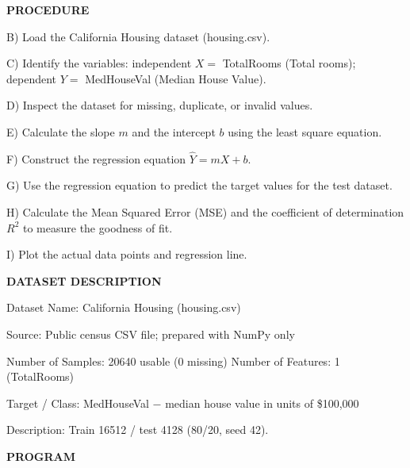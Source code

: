 \documentclass[11pt,twoside]{article}
\newcommand{\expheading}[1]{{\fontsize{14}{17}\selectfont\textbf{#1}\par}}
\newcommand{\toevenpage}{\clearpage\ifodd\value{page}\null\thispagestyle{empty}\newpage\fi}
\begin{document}
{\expheading{PROCEDURE}
\vspace{4pt}
\noindent B) Load the California Housing dataset (housing.csv).\par
\noindent C) Identify the variables: independent $X=$ TotalRooms (Total rooms); dependent $Y=$ MedHouseVal (Median House Value).\par
\noindent D) Inspect the dataset for missing, duplicate, or invalid values.\par
\noindent E) Calculate the slope $m$ and the intercept $b$ using the least square equation.\par
\noindent F) Construct the regression equation $\hat{Y}=mX+b$.\par
\noindent G) Use the regression equation to predict the target values for the test dataset.\par
\noindent H) Calculate the Mean Squared Error (MSE) and the coefficient of determination $R^2$ to measure the goodness of fit.\par
\noindent I) Plot the actual data points and regression line. \par
\vspace{4pt}

\expheading{DATASET DESCRIPTION}
\vspace{4pt}
\noindent Dataset Name: California Housing (housing.csv)\par
\noindent Source: Public census CSV file; prepared with NumPy only\par
\noindent Number of Samples: 20640 usable (0 missing) \hspace{0.3cm} Number of Features: 1 (TotalRooms)\par
\noindent Target / Class: MedHouseVal $-$ median house value in units of \$100{,}000\par
\noindent Description: Train 16512 / test 4128 (80/20, seed 42). \par
\vspace{4pt}
} %
\toevenpage
\expheading{PROGRAM}
\vspace{6pt}
\end{document}
